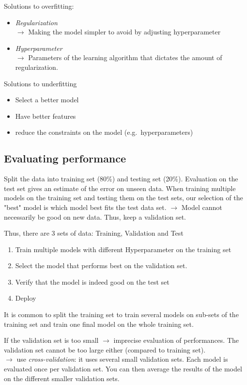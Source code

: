 \documentclass{article}
\begin{document}
Solutions to overfitting:
\begin{itemize}
  \item \textit{Regularization}\\
    $\rightarrow$ Making the model simpler to avoid by adjusting hyperparameter
  \item \textit{Hyperparameter}\\
    $\rightarrow$ Parameters of the learning algorithm that dictates the amount of regularization.
\end{itemize}

Solutions to underfitting
\begin{itemize}
  \item Select a better model
  \item Have better features
  \item reduce the constraints on the model (e.g.\ hyperparameters)
\end{itemize}

\subsection{Evaluating performance}

Split the data into training set (80\%) and testing set (20\%).
Evaluation on the test set gives an estimate of the error on unseen data.
When training multiple models on the training set and testing them on the test sets, our selection of the "best" model is which model best fits the test data set.
$\rightarrow$ Model cannot necessarily be good on new data.
Thus, keep a validation set.

Thus, there are 3 sets of data: Training, Validation and Test
\begin{enumerate}
  \item Train multiple models with different Hyperparameter on the training set
  \item Select the model that performs best on the validation set.
  \item Verify that the model is indeed good on the test set
  \item Deploy
\end{enumerate}

It is common to split the training set to train several models on sub-sets of the training set and train one final model on the whole training set.

If the validation set is too small $\rightarrow$ imprecise evaluation of performances.
The validation set cannot be too large either (compared to training set).\\
$\rightarrow$ use \emph{cross-validation}: it uses several small validation sets.
Each model is evaluated once per validation set.
You can then average the results of the model on the different smaller validation sets.
\end{document}
